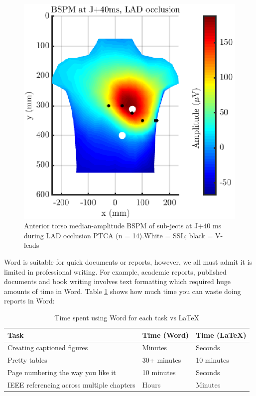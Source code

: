\documentclass{article}
\begin{document}
\begin{figure}[htbp!]
    \centering
    \includegraphics{pics/bspm_pbi_lad.eps}
    \caption{Anterior torso median-amplitude BSPM of sub-jects at J+40 ms during LAD occlusion PTCA (n = 14).White = SSL; black = V-leads \cite{jennings2019}}
    \label{fig:bspm}
\end{figure}

Word is suitable for quick documents or reports, however, we all must admit it is limited in professional writing. For example, academic reports, published documents and book writing involves text formatting which required huge amounts of time in Word. Table \ref{tab:time} shows how much time you can waste doing reports in Word:

\begin{table}[htbp!]
    \centering
    \def\arraystretch{1.5}%
    \caption{Time spent using Word for each task vs LaTeX}
    \begin{tabular}{p{7cm}|p{2.5cm}|p{2.5cm}}
        Task & Time (Word) & Time (LaTeX) \\
        \hline
        Creating captioned figures & Minutes & Seconds \\
        Pretty tables & 30+ minutes & 10 minutes \\
        Page numbering the way you like it & 10 minutes & Seconds \\
        IEEE referencing across multiple chapters & Hours & Minutes
    \end{tabular}
    \label{tab:time}
\end{table}

\newpage
{}  %


\end{document}
